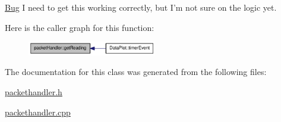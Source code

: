 \begin{Desc}
\item[\hyperlink{bug__bug000001}{Bug}]I need to get this working correctly, but I'm not sure on the logic yet. \end{Desc}




Here is the caller graph for this function:\nopagebreak
\begin{figure}[H]
\begin{center}
\leavevmode
\includegraphics[width=160pt]{classpacketHandler_aec6fa94602daa18227491b76001152cb_icgraph}
\end{center}
\end{figure}




The documentation for this class was generated from the following files:\begin{DoxyCompactItemize}
\item 
\hyperlink{packethandler_8h}{packethandler.h}\item 
\hyperlink{packethandler_8cpp}{packethandler.cpp}\end{DoxyCompactItemize}
